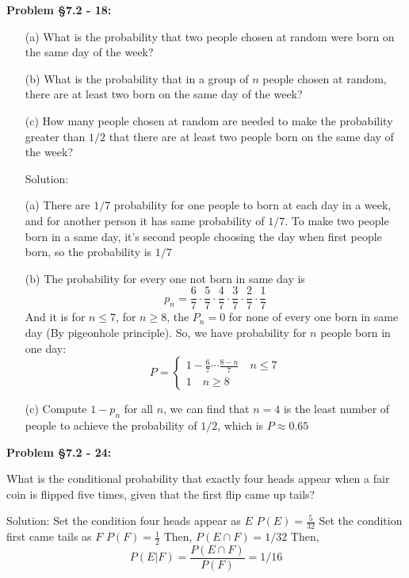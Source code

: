 \documentclass{article}
\newenvironment{problem}[1]
{\begin{mdframed}[default]
\textbf{Problem #1:}
}
{\end{mdframed}
}
\begin{document}
\begin{problem}{\S 7.2 - 18}
\begin{enumerate}
\item[(a)] What is the probability that two people chosen at random were born
on the same day of the week?
\item[(b)] What is the probability that in a group of $n$ people chosen at
random, there are at least two born on the same day of the week?
\item[(c)] How many people chosen at random are needed to make the probability
greater than $1/2$ that there are at least two people born on the same day of the
week?

Solution:

(a) There are $1/7$ probability for one people to born at each day in a week, and for another person it has same probability of $1/7$. To make two people born in a same day, it's second people choosing the day when first people born, so the probability is $1/7$

(b) The probability for every one not born in same day is \[p_n=\frac{6}{7}\cdot\frac{5}{7}\cdot\frac{4}{7}\cdot\frac{3}{7}\cdot\frac{2}{7}\cdot\frac{1}{7}\] And it is for $n\leq 7$, for $n\geq 8$, the $P_n=0$ for none of every one born in same day (By pigeonhole principle).
So, we have probability for $n$ people born in one day: \[P=\begin{cases}1-\frac{6}{7}\cdots\frac{8-n}{7}\quad n\leq 7\\1 \quad n\geq 8\end{cases}\]

(c) Compute $1-p_n$ for all $n$, we can find that $n=4$ is the least number of people to achieve the probability of $1/2$, which is $P\approx 0.65$
\end{enumerate}
\end{problem}
\begin{problem}{\S 7.2 - 24}
What is the conditional probability that exactly four heads appear when a fair coin
is flipped five times, given that the first flip came up tails?

Solution:
Set the condition four heads appear as $E$
$P(E)=\frac{5}{32}$
Set the condition first came tails as $F$
$P(F)=\frac{1}{2}$
Then, $P(E\cap F)=1/32$
Then, \[P(E|F)=\frac{P(E\cap F)}{P(F)}=1/16\]
\end{problem}
\end{document}
